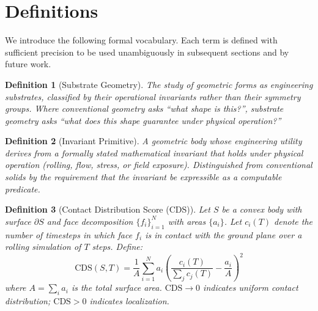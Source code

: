 \documentclass[11pt,a4paper]{article}
\newtheorem{definition}{Definition}
\begin{document}

\section{Definitions}

We introduce the following formal vocabulary. Each term is defined with
sufficient precision to be used unambiguously in subsequent sections and
by future work.

\begin{definition}[Substrate Geometry]
The study of geometric forms as engineering substrates, classified by
their operational invariants rather than their symmetry groups. Where
conventional geometry asks ``what shape is this?'', substrate geometry
asks ``what does this shape guarantee under physical operation?''
\end{definition}

\begin{definition}[Invariant Primitive]
A geometric body whose engineering utility derives from a formally
stated mathematical invariant that holds under physical operation
(rolling, flow, stress, or field exposure). Distinguished from
conventional solids by the requirement that the invariant be
expressible as a computable predicate.
\end{definition}

\begin{definition}[Contact Distribution Score (CDS)]
\label{def:cds}
Let $S$ be a convex body with surface $\partial S$ and face
decomposition $\{f_i\}_{i=1}^N$ with areas $\{a_i\}$. Let $c_i(T)$
denote the number of timesteps in which face $f_i$ is in contact with
the ground plane over a rolling simulation of $T$ steps. Define:
\begin{equation}
  \mathrm{CDS}(S, T) = \frac{1}{A} \sum_{i=1}^{N} a_i
    \left(\frac{c_i(T)}{\sum_j c_j(T)} - \frac{a_i}{A}\right)^2
\end{equation}
where $A = \sum_i a_i$ is the total surface area. $\mathrm{CDS} \to 0$
indicates uniform contact distribution; $\mathrm{CDS} > 0$ indicates
localization.
\end{definition}
\end{document}
